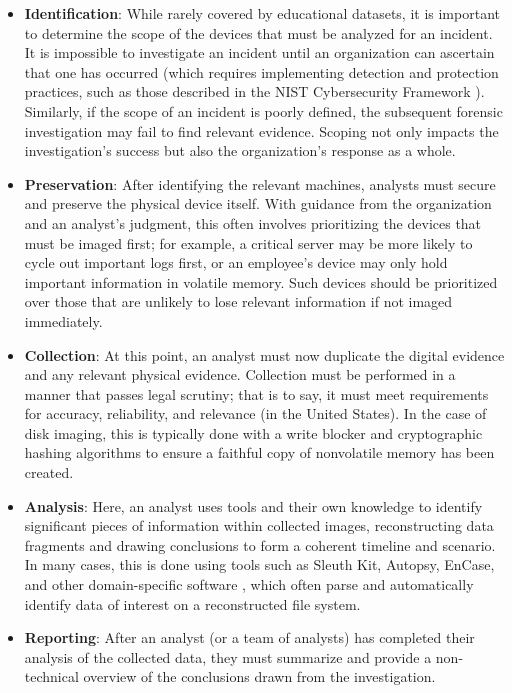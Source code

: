 \documentclass[letterpaper,12pt]{report}
\def\tightlist{}
\begin{document}
\begin{itemize}
\tightlist
\item
  \textbf{Identification}: While rarely covered by educational datasets,
  it is important to determine the scope of the devices that must be
  analyzed for an incident. It is impossible to investigate an incident
  until an organization can ascertain that one has occurred (which
  requires implementing detection and protection practices, such as
  those described in the NIST Cybersecurity Framework
  \cite{nationalinstituteofstandardsandtechnologyNISTCybersecurityFramework2024}).
  Similarly, if the scope of an incident is poorly defined, the
  subsequent forensic investigation may fail to find relevant evidence.
  Scoping not only impacts the investigation's success but also the
  organization's response as a whole.
\item
  \textbf{Preservation}: After identifying the relevant machines,
  analysts must secure and preserve the physical device itself. With
  guidance from the organization and an analyst's judgment, this often
  involves prioritizing the devices that must be imaged first; for
  example, a critical server may be more likely to cycle out important
  logs first, or an employee's device may only hold important
  information in volatile memory. Such devices should be prioritized
  over those that are unlikely to lose relevant information if not
  imaged immediately.
\item
  \textbf{Collection}: At this point, an analyst must now duplicate the
  digital evidence and any relevant physical evidence. Collection must
  be performed in a manner that passes legal scrutiny; that is to say,
  it must meet requirements for accuracy, reliability, and relevance
  \cite{conklinComputerForensics2022,garfinkelBringingScienceDigital2009}
  (in the United States). In the case of disk imaging, this is typically
  done with a write blocker and cryptographic hashing algorithms to
  ensure a faithful copy of nonvolatile memory has been created.
\item
  \textbf{Analysis}: Here, an analyst uses tools and their own knowledge
  to identify significant pieces of information within collected images,
  reconstructing data fragments and drawing conclusions to form a
  coherent timeline and scenario. In many cases, this is done using
  tools such as Sleuth Kit, Autopsy, EnCase, and other domain-specific
  software \cite{jonesInsightDigitalForensics2022}, which often
  parse and automatically identify data of interest on a reconstructed
  file system.
\item
  \textbf{Reporting}: After an analyst (or a team of analysts) has
  completed their analysis of the collected data, they must summarize
  and provide a non-technical overview of the conclusions drawn from the
  investigation.
\end{itemize}
\end{document}
